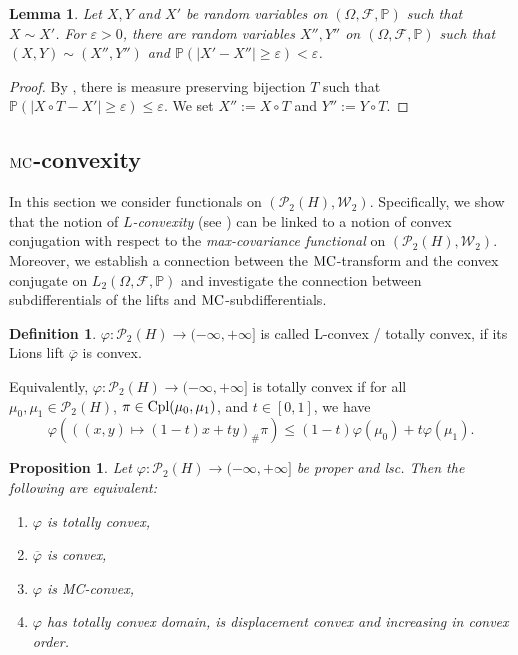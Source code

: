 \documentclass[a4paper]{amsart}
\numberwithin{theorem}{section}
\newtheorem{lemma}[theorem]{Lemma}
\newtheorem{proposition}[theorem]{Proposition}
\theoremstyle{definition}
\newtheorem{definition}[theorem]{Definition}
\newcommand{\F}{\mathcal{F}}
\newcommand{\cpl}{\textup{Cpl}}
\newcommand{\W}{\mathcal{W}}
\newcommand{\Pc}{\mathcal P}
\renewcommand{\epsilon}{\varepsilon}
\renewcommand{\P}{\mathbb{P}}
\renewcommand{\H}{H}
\renewcommand{\phi}{\varphi}
\newcommand{\mc}{\textup{MC}}
\begin{document}
\begin{lemma}\label{lem:epsTransfer}
Let $X,Y$ and $X'$ be random variables on $(\Omega,\F,\P)$ such that $X \sim X'$. For $\epsilon>0$, there are random variables $X'', Y''$ on $(\Omega,\F,\P)$ such that $(X,Y) \sim (X'',Y'')$ and $\P(|X'-X''| \ge \epsilon) < \epsilon$.
\end{lemma}
\begin{proof}
By , there is measure preserving bijection $T$ such that $\P(|X \circ T - X'| \ge \epsilon) \le \epsilon$. We set $X'':= X \circ T$ and $Y'':= Y \circ T$. 
\end{proof}










\subsection{$\mc$-convexity}
In this section we consider functionals on  $(\Pc_2(\H),\W_2)$. Specifically, we  show that the notion of \emph{$L$-convexity} (see \cite{CaDe18}) can be linked to a notion of convex conjugation with respect to the \emph{max-covariance functional} on $(\Pc_2(\H),\W_2)$. Moreover, we establish a connection between the $\mc$-transform and the convex conjugate on $L_2(\Omega,\F,\P)$ and investigate the connection between subdifferentials of the lifts and $\mc$-subdifferentials.
 


\begin{definition}
$\phi : \Pc_2(\H) \to (-\infty, +\infty]$ is called L-convex / totally convex, if its Lions lift $\overline{\phi}$ is convex.
\end{definition}
Equivalently,
 $\phi : \Pc_2(\H) \to (-\infty, +\infty]$ is totally convex  if for all $\mu_0, \mu_1 \in \Pc_2(\H)$, $\pi \in \cpl(\mu_0,\mu_1)$, and $t \in [0,1]$, we have
 \[
  \phi( ((x,y) \mapsto (1-t)x+ty)_\# \pi ) \le (1-t) \phi(\mu_0) +t \phi(\mu_1).
 \]
 

\begin{proposition}\label{prop:ConvexEquiv} 
Let $\phi : \Pc_2(\H) \to (-\infty, +\infty]$ be proper and lsc. Then the following are equivalent:
\begin{enumerate}
    \item $\phi$ is totally convex,
    \item $\overline{\phi}$ is convex,
    \item $\phi$ is MC-convex,
    \item $\phi$ has totally convex domain, is displacement convex and increasing in convex order.
\end{enumerate}
\end{proposition}
\end{document}
